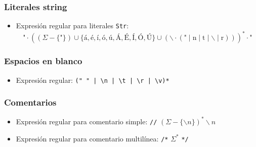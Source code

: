 \subsubsection{Literales string}

\begin{itemize}[leftmargin=*]
    \item Expresión regular para literales \texttt{Str}:
    \[
    \text{"} \cdot
    \left(
        (\Sigma - \{\text{"}\})
        \cup
        \{á,é,í,ó,ú,Á,É,Í,Ó,Ú\}
        \cup
        \left(
            \backslash \cdot
            (\text{"} \mid \text{n} \mid \text{t}
            \mid \backslash \mid \text{r})
        \right)
    \right)^*
    \cdot \text{"}
    \]

\end{itemize}



\subsubsection{Espacios en blanco}
\begin{itemize}[leftmargin=*]
  \item Expresión regular: \verb~(" " | \n | \t | \r | \v)*~
\end{itemize}


\subsubsection{Comentarios}
\begin{itemize}[leftmargin=*]
  \item Expresión regular para comentario simple:
  \texttt{//} $(\Sigma - \{\backslash n\})^* \backslash n$

  \item Expresión regular para comentario multilínea:
  \texttt{/*} $\Sigma^*$ \texttt{*/}
\end{itemize}


